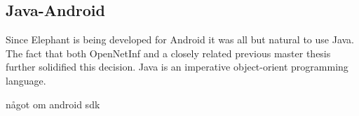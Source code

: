 \subsection{Java-Android}

Since Elephant is being developed for Android it was all but natural to use Java. The fact that both OpenNetInf and a closely related previous master thesis \cite{masterthesis} further solidified this decision. Java is an imperative object-orient programming language.

något om android sdk